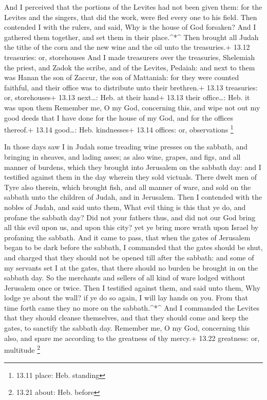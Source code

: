  And I perceived that the portions of the Levites had not
been given them: for the Levites and the singers, that did the work,
were fled every one to his field.  Then contended I with
the rulers, and said, Why is the house of God forsaken? And I gathered
them together, and set them in their place.\^{}*\^{}  Then
brought all Judah the tithe of the corn and the new wine and the oil
unto the treasuries.+ 13.12 treasuries: or, storehouses 
And I made treasurers over the treasuries, Shelemiah the priest, and
Zadok the scribe, and of the Levites, Pedaiah: and next to them was
Hanan the son of Zaccur, the son of Mattaniah: for they were counted
faithful, and their office was to distribute unto their brethren.+ 13.13
treasuries: or, storehouses+ 13.13 next\ldots: Heb. at their hand+ 13.13
their office\ldots: Heb. it was upon them  Remember me, O
my God, concerning this, and wipe not out my good deeds that I have done
for the house of my God, and for the offices thereof.+ 13.14 good\ldots:
Heb. kindnesses+ 13.14 offices: or, observations \footnote{13.11 place:
  Heb. standing}

 In those days saw I in Judah some treading wine presses on
the sabbath, and bringing in sheaves, and lading asses; as also wine,
grapes, and figs, and all manner of burdens, which they brought into
Jerusalem on the sabbath day: and I testified against them in the day
wherein they sold victuals.  There dwelt men of Tyre also
therein, which brought fish, and all manner of ware, and sold on the
sabbath unto the children of Judah, and in Jerusalem.  Then
I contended with the nobles of Judah, and said unto them, What evil
thing is this that ye do, and profane the sabbath day?  Did
not your fathers thus, and did not our God bring all this evil upon us,
and upon this city? yet ye bring more wrath upon Israel by profaning the
sabbath.  And it came to pass, that when the gates of
Jerusalem began to be dark before the sabbath, I commanded that the
gates should be shut, and charged that they should not be opened till
after the sabbath: and some of my servants set I at the gates, that
there should no burden be brought in on the sabbath day. 
So the merchants and sellers of all kind of ware lodged without
Jerusalem once or twice.  Then I testified against them,
and said unto them, Why lodge ye about the wall? if ye do so again, I
will lay hands on you. From that time forth came they no more on the
sabbath.\^{}*\^{}  And I commanded the Levites that they
should cleanse themselves, and that they should come and keep the gates,
to sanctify the sabbath day. Remember me, O my God, concerning this
also, and spare me according to the greatness of thy mercy.+ 13.22
greatness: or, multitude \footnote{13.21 about: Heb. before}

